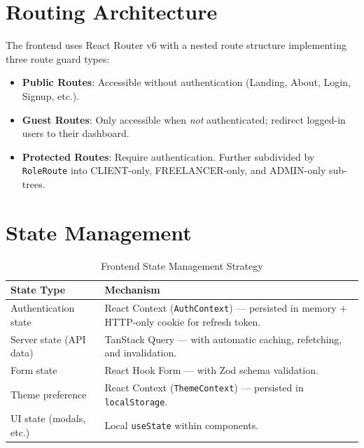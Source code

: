 \section{Routing Architecture}

The frontend uses React Router v6 with a nested route structure implementing three route guard types:

\begin{itemize}
  \item \textbf{Public Routes}: Accessible without authentication (Landing, About, Login, Signup, etc.).
  \item \textbf{Guest Routes}: Only accessible when \textit{not} authenticated; redirect logged-in users to their dashboard.
  \item \textbf{Protected Routes}: Require authentication. Further subdivided by \texttt{RoleRoute} into CLIENT-only, FREELANCER-only, and ADMIN-only sub-trees.
\end{itemize}

\section{State Management}

\begin{table}[H]
\centering
\caption{Frontend State Management Strategy}
\begin{tabularx}{\textwidth}{lX}
\toprule
\textbf{State Type} & \textbf{Mechanism} \\
\midrule
Authentication state  & React Context (\texttt{AuthContext}) — persisted in memory + HTTP-only cookie for refresh token. \\
Server state (API data) & TanStack Query — with automatic caching, refetching, and invalidation. \\
Form state            & React Hook Form — with Zod schema validation. \\
Theme preference      & React Context (\texttt{ThemeContext}) — persisted in \texttt{localStorage}. \\
UI state (modals, etc.) & Local \texttt{useState} within components. \\
\bottomrule
\end{tabularx}
\end{table}
